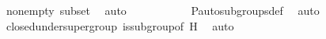 \begin{isabellebody}
\ {\isasymF}{\isacharunderscore}{\kern0pt}nonempty\ {\isasymF}{\isacharunderscore}{\kern0pt}subset\ \isamarkupfalse%
\ auto\ \isanewline
\ \ \isamarkupfalse%
\ \isamarkupfalse%
\ {\isachardoublequoteopen}{\isasymI}\ {\isasymsubseteq}\ {\isasymG}{\isachardoublequoteclose}\ \isamarkupfalse%
\ P{\isacharunderscore}{\kern0pt}auto{\isacharunderscore}{\kern0pt}subgroups{\isacharunderscore}{\kern0pt}def\ \isamarkupfalse%
\ auto\ \isanewline
\ \ \isamarkupfalse%
\ \isamarkupfalse%
\ {\isachardoublequoteopen}{\isasymG}\ {\isasymin}\ {\isasymF}{\isachardoublequoteclose}\ \isamarkupfalse%
\ {\isasymF}{\isacharunderscore}{\kern0pt}closed{\isacharunderscore}{\kern0pt}under{\isacharunderscore}{\kern0pt}supergroup\ {\isasymG}{\isacharunderscore}{\kern0pt}is{\isacharunderscore}{\kern0pt}subgroup{\isacharunderscore}{\kern0pt}of{\isacharunderscore}{\kern0pt}{\isasymG}\ H\ \isamarkupfalse%
\ auto\isanewline
{}\isamarkupfalse%
%
\endisatagproof
{\isafoldproof}%
%
\isadelimproof
\isanewline
%
\endisadelimproof
\isanewline
{}\isamarkupfalse%
\isanewline
%
\isadelimtheory
%
\endisadelimtheory
%
\isatagtheory
{}\isamarkupfalse%
%
\endisatagtheory
{\isafoldtheory}%
%
\isadelimtheory
%
\endisadelimtheory
%
\end{isabellebody}%
\endinput
